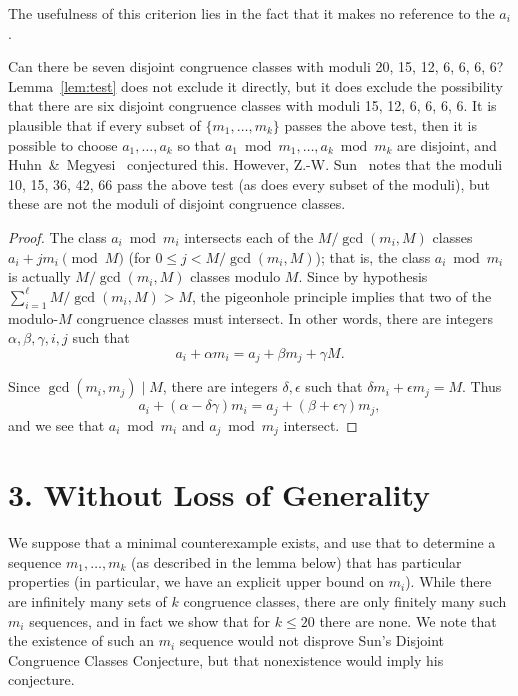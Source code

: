 \documentclass[12pt]{article}
\begin{document}
The usefulness of this criterion lies in the fact that it makes no reference to the $a_i$.

Can there be seven disjoint congruence classes with moduli 20, 15, 12, 6, 6, 6, 6? Lemma~\ref{lem:test} does not
exclude it directly, but it does exclude the possibility that there are six disjoint congruence classes with
moduli 15, 12, 6, 6, 6, 6. It is plausible that if every subset of $\{m_1,\dots,m_k\}$ passes the above test,
then it is possible to choose $a_1,\dots,a_k$ so that $a_1\bmod{m_1},\dots,a_k\bmod{m_k}$ are disjoint, and
Huhn~\&~Megyesi~\cite{Huhn.Megyesi} conjectured this. However, Z.-W. Sun~\cite{Sun1} notes that the moduli 10,
15, 36, 42, 66 pass the above test (as does every subset of the moduli), but these are not the moduli of
disjoint congruence classes.

\begin{proof}
The class $a_i\bmod m_i$ intersects each of the $M/\gcd(m_i,M)$ classes $a_i + j m_i \pmod M$ (for $0\le j <
{M}/{\gcd(m_i,M)}$); that is, the class $a_i \bmod m_i$ is actually $M/\gcd(m_i,M)$ classes modulo $M$. Since by
hypothesis $\sum_{i=1}^\ell M/\gcd(m_i,M) >M$, the pigeonhole principle implies that two of the modulo-$M$
congruence classes must intersect. In other words, there are integers $\alpha,\beta,\gamma,i,j$ such that
    \[a_i+\alpha m_i = a_j + \beta m_j +\gamma M.\]

Since $\gcd(m_i,m_j) \mid M$, there are integers $\delta,\epsilon$ such that $\delta m_i+\epsilon m_j=M$. Thus
    \[a_i+(\alpha-\delta\gamma) m_i = a_j +(\beta+\epsilon\gamma) m_j,\]
and we see that $a_i \bmod m_i$ and $a_j \bmod m_j$ intersect.
\end{proof}

\vskip 30pt
\section*{\normalsize 3. Without Loss of Generality}
We suppose that a minimal counterexample exists, and use that to determine a sequence $m_1,\dots,m_k$ (as
described in the lemma below) that has particular properties (in particular, we have an explicit upper bound on
$m_i$). While there are infinitely many sets of $k$ congruence classes, there are only finitely many such $m_i$
sequences, and in fact we show that for $k\leq 20$ there are none. We note that the existence of such an $m_i$
sequence would not disprove Sun's Disjoint Congruence Classes Conjecture, but that nonexistence would imply his
conjecture.
\end{document}
